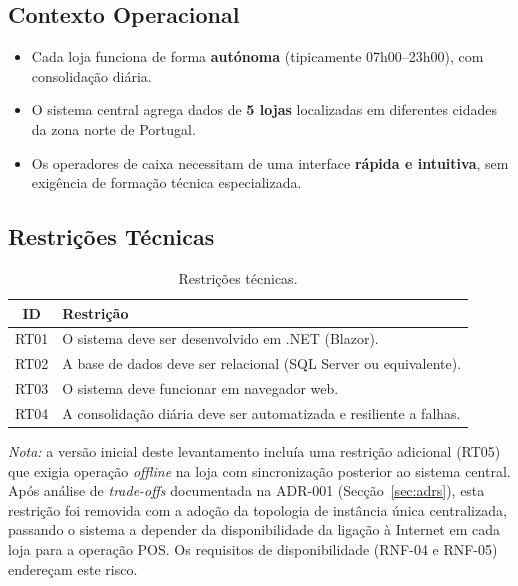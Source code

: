     \subsection{Contexto Operacional}
    \begin{itemize}
        \item Cada loja funciona de forma \textbf{autónoma} (tipicamente 07h00--23h00), com consolidação diária.
        \item O sistema central agrega dados de \textbf{5 lojas} localizadas em diferentes cidades da zona norte de Portugal.
        \item Os operadores de caixa necessitam de uma interface \textbf{rápida e intuitiva}, sem exigência de formação técnica especializada.
    \end{itemize}

    \subsection{Restrições Técnicas}
    \begin{table}[H]
    \centering
    \begin{tabular}{|c|p{12cm}|}
    \hline
    \textbf{ID} & \textbf{Restrição} \\
    \hline
    RT01 & O sistema deve ser desenvolvido em .NET (Blazor). \\
    \hline
    RT02 & A base de dados deve ser relacional (SQL Server ou equivalente). \\
    \hline
    RT03 & O sistema deve funcionar em navegador web. \\
    \hline
    RT04 & A consolidação diária deve ser automatizada e resiliente a falhas. \\
    \hline
    \end{tabular}
    \caption{Restrições técnicas.}
    \label{tab:restricoes_tecnicas}
    \end{table}

    \textit{Nota:} a versão inicial deste levantamento incluía uma restrição adicional (RT05) que exigia operação \textit{offline} na loja com sincronização posterior ao sistema central. Após análise de \textit{trade-offs} documentada na ADR-001 (Secção~\ref{sec:adrs}), esta restrição foi removida com a adoção da topologia de instância única centralizada, passando o sistema a depender da disponibilidade da ligação à Internet em cada loja para a operação POS. Os requisitos de disponibilidade (RNF-04 e RNF-05) endereçam este risco.

